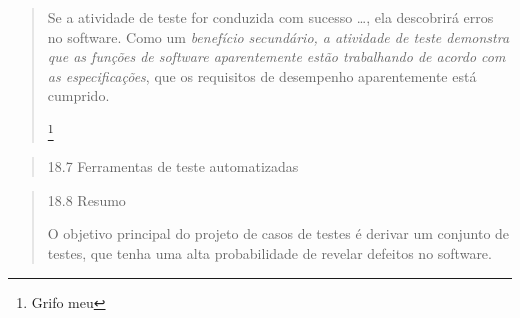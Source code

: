 \begin{frame}{\subsecname}
  \blockquote[{\cite[Pressman]{pressman_engenharia_1995}}]{
    Se a atividade de teste for conduzida com sucesso \ldots, ela descobrirá
    erros no software. Como um \emph{benefício secundário, a atividade de
    teste demonstra que as funções de software aparentemente estão trabalhando de
    acordo com as especificações}, que os requisitos de desempenho aparentemente
    está cumprido.

    \let\thefootnote\relax\footnote{Grifo meu}
  }
\end{frame}

\begin{frame}{\subsecname}
  \blockquote[{\cite[Pressman]{pressman_engenharia_1995}}]{
    18.7 Ferramentas de teste automatizadas
  }
\end{frame}

\begin{frame}{\subsecname}
  \blockquote[{\cite[Pressman]{pressman_engenharia_1995}}]{
    18.8 Resumo

    O objetivo principal do projeto de casos de testes é derivar um conjunto de
    testes, que tenha uma alta probabilidade de revelar defeitos no software.
  }
\end{frame}

